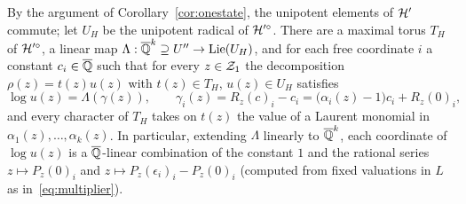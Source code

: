 \begin{proposition}\label{prop:lifting}
By the argument of Corollary~\ref{cor:onestate}, the unipotent elements of $\mathcal{H}'$ commute; let $U_H$ be the unipotent radical of $\mathcal{H}'^\circ$. There are a maximal torus $T_H$ of $\mathcal{H}'^\circ$, a linear map $\Lambda:\overline{\mathbb{Q}}^k\supseteq U''\to\operatorname{Lie}(U_H)$, and for each free coordinate $i$ a constant $c_i\in\overline{\mathbb{Q}}$ such that for every $z\in\mathcal{Z}_1$ the decomposition $\rho(z)=t(z)u(z)$ with $t(z)\in T_H$, $u(z)\in U_H$ satisfies
\[
\log u(z)=\Lambda(\gamma(z)),\qquad \gamma_i(z)=R_z(c)_i-c_i=\bigl(\alpha_i(z)-1\bigr)c_i+R_z(0)_i ,
\]
and every character of $T_H$ takes on $t(z)$ the value of a Laurent monomial in $\alpha_1(z),\ldots,\alpha_k(z)$. In particular, extending $\Lambda$ linearly to $\overline{\mathbb{Q}}^k$, each coordinate of $\log u(z)$ is a $\overline{\mathbb{Q}}$-linear combination of the constant $1$ and the rational series $z\mapsto P_z(0)_i$ and $z\mapsto P_z(\epsilon_i)_i-P_z(0)_i$ (computed from fixed valuations in $L$ as in~\eqref{eq:multiplier}).
\end{proposition}
